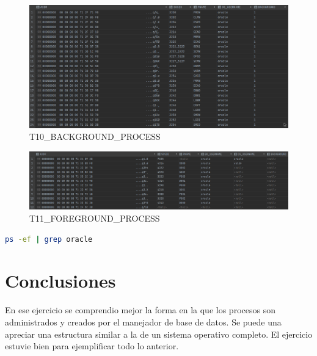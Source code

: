 \documentclass[journal]{IEEEtran}
\begin{document}
\begin{figure}[H]
  \centering
  \includegraphics[scale=.20]{captura_10.png}
   \caption{T10\_BACKGROUND\_PROCESS}
   \label{fig:validador_10}
\end{figure}
\begin{figure}[H]
  \centering
  \includegraphics[scale=.18]{captura_11.png}
   \caption{T11\_FOREGROUND\_PROCESS}
   \label{fig:validador_11}
\end{figure}
\begin{lstlisting}[language=bash, caption=instrucciones SO,label={lst:codigo7}]
ps -ef | grep oracle
\end{lstlisting}
\section{Conclusiones}
En ese ejercicio se comprendio mejor la forma en la que los procesos son administrados y 
creados por el manejador de base de datos. Se puede una apreciar una estructura similar a la de 
un sistema operativo completo. El ejercicio estuvie bien para ejemplificar todo lo anterior.
\ifCLASSOPTIONcaptionsoff
  \newpage

\fi
\end{document}
